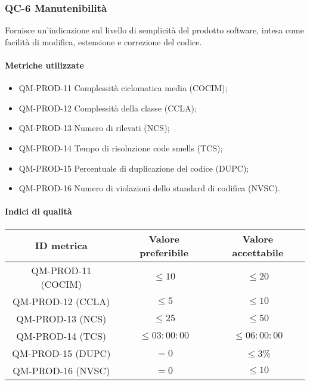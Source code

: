 \subsubsection{QC-6 Manutenibilità}
Fornisce un'indicazione sul livello di semplicità del prodotto software, intesa come facilità di modifica, estensione e correzione del codice.

	\paragraph{Metriche utilizzate}
	\begin{itemize}
		\item QM-PROD-11 Complessità ciclomatica media (COCIM);
		\item QM-PROD-12 Complessità della classe (CCLA);
		\item QM-PROD-13 Numero di  rilevati (NCS);
		\item QM-PROD-14 Tempo di risoluzione code smells (TCS);
		\item QM-PROD-15 Percentuale di duplicazione del codice (DUPC);
		\item QM-PROD-16 Numero di violazioni dello standard di codifica (NVSC).
	\end{itemize}

	\paragraph{Indici di qualità}
	\begin{center}
		\begin{tabular}{|c|c|c|}
			\rowcolor{lighter-grayer}
			\hline
			\textbf{ID metrica} & \textbf{Valore preferibile} & \textbf{Valore accettabile} \\
			\hline
			QM-PROD-11 (COCIM) & \(\le 10\) & \(\le 20\) \\
			\hline
			QM-PROD-12 (CCLA) & \(\le 5\) & \(\le 10\) \\
			\hline
			QM-PROD-13 (NCS) & \(\le 25\) & \(\le 50\) \\
			\hline
			QM-PROD-14 (TCS) & \(\le 03:00:00\) & \(\le 06:00:00\) \\
			\hline
			QM-PROD-15 (DUPC) & \(= 0\) & \(\le 3\)\% \\
			\hline
			QM-PROD-16 (NVSC) & \(= 0\) & \(\le 10\) \\
			\hline
		\end{tabular}
	\end{center}

